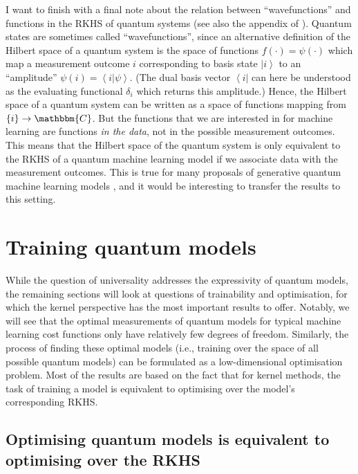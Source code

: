 \documentclass[aps, reprint, onecolumn, nofootinbib, longbibliography]{revtex4-2}
\newcommand{\ket}[1]{\ensuremath{\left| #1 \right \rangle}}
\newcommand{\bra}[1]{\ensuremath{\left \langle #1 \right |}}
\newcommand{\braket}[2]{\ensuremath{\left\langle #1\left|#2 \right.\right\rangle}}
\begin{document}
I want to finish with a final note about the relation between ``wavefunctions'' and functions in the RKHS of quantum systems (see also the appendix of \cite{schuld2019quantum}). Quantum states are sometimes called ``wavefunctions'', since an alternative definition of the Hilbert space of a quantum system is the space of functions $f(\cdot) = \psi(\cdot)$ which map a measurement outcome $i$ corresponding to basis state $\ket{i}$ to an ``amplitude'' $\psi(i) = \braket{i}{\psi}$. (The dual basis vector $\bra{i}$ can here be understood as the evaluating functional $\delta_{i}$ which returns this amplitude.) Hence, the Hilbert space of a quantum system can be written as a space of functions mapping from $\{i\} \rightarrow \mathbbm{C}$. But the functions that we are interested in for machine learning are functions \textit{in the data}, not in the possible measurement outcomes. This means that the Hilbert space of the quantum system is only equivalent to the RKHS of a quantum machine learning model if we associate data with the measurement outcomes. This is true for many proposals of generative quantum machine learning models \cite{benedetti2019generative, cheng2018information}, and it would be interesting to transfer the results to this setting. 



\section{Training quantum models}\label{sec:optimisation}

While the question of universality addresses the expressivity of quantum models, the remaining sections will look at questions of trainability and optimisation, for which the kernel perspective has the most important results to offer. Notably, we will see that the optimal measurements of quantum models for typical machine learning cost functions only have relatively few degrees of freedom. Similarly, the process of finding these optimal models (i.e., training over the space of all possible quantum models) can be formulated as a low-dimensional optimisation problem. Most of the results are based on the fact that for kernel methods, the task of training a model is equivalent to optimising over the model's corresponding RKHS.

\subsection{Optimising quantum models is equivalent to optimising over the RKHS}\label{ssec:optimsing_rkhs}
\end{document}
